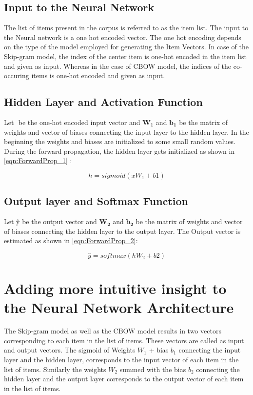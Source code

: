 \subsection{Input to the Neural Network}
The list of items present in the corpus is referred to as the item list. The input to the Neural network is a one hot encoded vector. The one hot encoding depends on the type of the model employed for generating the Item Vectors. In case of the Skip-gram model, the index of the center item is one-hot encoded in the item list and given as input. Whereas in the case of CBOW model, the indices of the co-occuring items is one-hot encoded and given as input. 

\subsection{Hidden Layer and Activation Function}
Let $\boldsymbol{}$ be the one-hot encoded input vector and $\boldsymbol{W_1}$ and $\boldsymbol{b_1}$ be the matrix of weights and vector of biases connecting the input layer to the hidden layer. In the beginning the weights and biases are initialized to some small random values. During the forward propagation, the hidden layer gets initialized as shown in \ref{eqn:ForwardProp_1} :

\begin{equation} \label{eqn:ForwardProp_1}
h=sigmoid(x W_1+b1)
\end{equation}

\subsection{Output layer and Softmax Function}
Let \^{y} be the output vector and $\boldsymbol{W_2}$ and $\boldsymbol{b_2}$ be the matrix of weights and vector of biases connecting the hidden layer to the output layer. The Output vector is estimated as shown in \ref{eqn:ForwardProp_2}:

\begin{equation} \label{eqn:ForwardProp_2}
\hat{y}=softmax(h W_2+b2)
\end{equation}

\section{Adding more intuitive insight to the Neural Network Architecture}
The Skip-gram model as well as the CBOW model results in two vectors corresponding to each item in the list of items. These vectors are called as input and output vectors. The sigmoid of Weights $W_1$ + bias $b_1$ connecting the input layer and the hidden layer, corresponds to the input vector of each item in the list of items. Similarly the weights $W_2$ summed with the bias $b_2$ connecting the hidden layer and the output layer corresponds to the output vector of each item in the list of items. 

